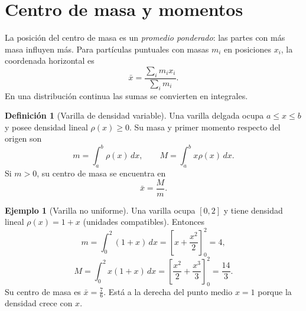 \documentclass[12pt]{article}
\theoremstyle{definition}
\newtheorem{definicion}[teorema]{Definición}
\newtheorem{ejemplo}[teorema]{Ejemplo}
\theoremstyle{remark}
\newcommand{\dd}{\,dx}
\begin{document}
\section{Centro de masa y momentos}
La posición del centro de masa es un \emph{promedio ponderado}: las partes con más masa influyen más. Para partículas puntuales con masas $m_i$ en posiciones $x_i$, la coordenada horizontal es
\[\bar x=\frac{\sum_i m_i x_i}{\sum_i m_i}.\]
En una distribución continua las sumas se convierten en integrales.
\begin{definicion}[Varilla de densidad variable]
Una varilla delgada ocupa $a\le x\le b$ y posee densidad lineal $\rho(x)\ge0$. Su masa y primer momento respecto del origen son
\[m=\int_a^b\rho(x)\dd,\qquad M=\int_a^b x\rho(x)\dd.\]
Si $m>0$, su centro de masa se encuentra en
\[\boxed{\bar x=\frac{M}{m}.}\]
\end{definicion}
\begin{ejemplo}[Varilla no uniforme]
Una varilla ocupa $[0,2]$ y tiene densidad lineal $\rho(x)=1+x$ (unidades compatibles). Entonces
\[m=\int_0^2(1+x)\dd=\left[x+\frac{x^2}{2}\right]_0^2=4,\]
\[M=\int_0^2x(1+x)\dd
=\left[\frac{x^2}{2}+\frac{x^3}{3}\right]_0^2=\frac{14}{3}.\]
Su centro de masa es $\boxed{\bar x=\frac76}$. Está a la derecha del punto medio $x=1$ porque la densidad crece con $x$.
\end{ejemplo}
\end{document}
